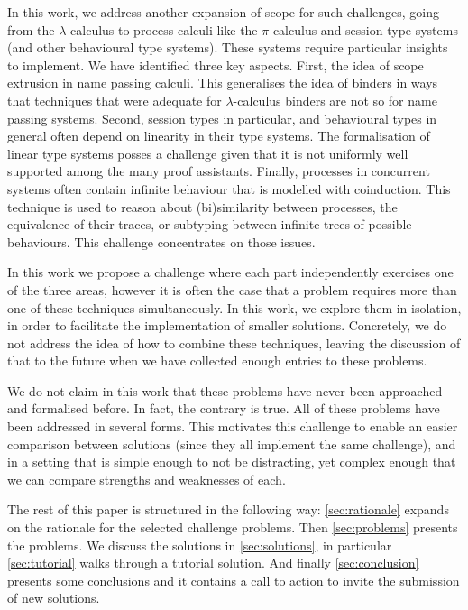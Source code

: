\documentclass{jfp}
\begin{document}
In this work, we address another expansion of scope for such
challenges, going from the $\lambda$-calculus to process calculi like
the $\pi$-calculus and session type systems (and other behavioural
type systems). These systems require particular insights to implement.
We have identified three key aspects. First, the idea of scope
extrusion in name passing calculi. This generalises the idea of
binders in ways that techniques that were adequate for
$\lambda$-calculus binders are not so for name passing systems.
Second, session types in particular, and behavioural types in general
often depend on linearity in their type systems. The formalisation of
linear type systems posses a challenge given that it is not uniformly
well supported among the many proof assistants. Finally, processes in
concurrent systems often contain infinite behaviour that is modelled
with coinduction. This technique is used to reason about
(bi)similarity between processes, the equivalence of their traces, or
subtyping between infinite trees of possible behaviours. This
challenge concentrates on those issues.

In this work we propose a challenge where each part independently
exercises one of the three areas, however it is often the case that a
problem requires more than one of these techniques simultaneously. In
this work, we explore them in isolation, in order to facilitate the
implementation of smaller solutions. Concretely, we do not address the
idea of how to combine these techniques, leaving the discussion of
that to the future when we have collected enough entries to these
problems.

We do not claim in this work that these problems have never been
approached and formalised before. In fact, the contrary is true. All
of these problems have been addressed in several forms. This motivates
this challenge to enable an easier comparison between solutions (since
they all implement the same challenge), and in a setting that is
simple enough to not be distracting, yet complex enough that we can
compare strengths and weaknesses of each.

The rest of this paper is structured in the following way:
\cref{sec:rationale} expands on the rationale for the selected
challenge problems. Then \cref{sec:problems} presents the problems. We
discuss the solutions in \cref{sec:solutions}, in particular
\cref{sec:tutorial} walks through a tutorial solution. And finally
\cref{sec:conclusion} presents some conclusions and it contains a call
to action to invite the submission of new solutions.
\end{document}
